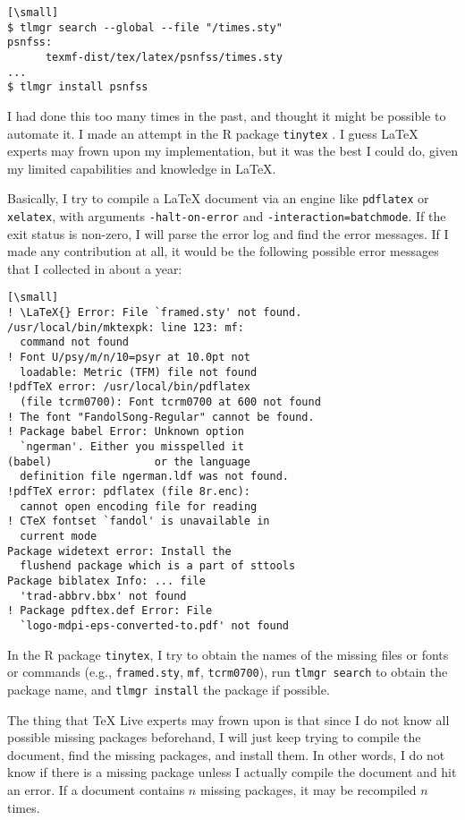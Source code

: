 \documentclass{ltugboat}
\def\tinytex{\texttt{tinytex}}
\begin{document}
\begin{verbatim}[\small]
$ tlmgr search --global --file "/times.sty"
psnfss:
      texmf-dist/tex/latex/psnfss/times.sty
...
$ tlmgr install psnfss
\end{verbatim}

I had done this too many times in the past, and thought it might be
possible to automate it. I made an attempt in the R package
\tinytex{} \cite{R-tinytex}. I guess \LaTeX{} experts may frown upon
my implementation, but it was the best I could do, given my limited
capabilities and knowledge in \LaTeX{}.

Basically, I try to compile a \LaTeX{} document via an engine like
\texttt{pdflatex} or \texttt{xelatex}, with arguments
\texttt{-halt-on-error} and \texttt{-interaction=batchmode}. If the exit
status is non-zero, I will parse the error log and find the error
messages. If I made any contribution at all, it would be the following
possible error messages that I collected in about a year:

\begin{verbatim}[\small]
! \LaTeX{} Error: File `framed.sty' not found.
/usr/local/bin/mktexpk: line 123: mf:
  command not found
! Font U/psy/m/n/10=psyr at 10.0pt not
  loadable: Metric (TFM) file not found
!pdfTeX error: /usr/local/bin/pdflatex
  (file tcrm0700): Font tcrm0700 at 600 not found
! The font "FandolSong-Regular" cannot be found.
! Package babel Error: Unknown option
  `ngerman'. Either you misspelled it
(babel)                or the language
  definition file ngerman.ldf was not found.
!pdfTeX error: pdflatex (file 8r.enc):
  cannot open encoding file for reading
! CTeX fontset `fandol' is unavailable in
  current mode
Package widetext error: Install the
  flushend package which is a part of sttools
Package biblatex Info: ... file
  'trad-abbrv.bbx' not found
! Package pdftex.def Error: File
  `logo-mdpi-eps-converted-to.pdf' not found
\end{verbatim}

In the R package \tinytex{}, I try to obtain the names of the
missing files or fonts or commands (e.g., \texttt{framed.sty},
\texttt{mf}, \texttt{tcrm0700}), run \texttt{tlmgr\ search} to obtain
the package name, and \texttt{tlmgr\ install} the package if possible.

The thing that \TeX{} Live experts may frown upon is that since I do not
know all possible missing packages beforehand, I will just keep trying
to compile the document, find the missing packages, and install them. In
other words, I do not know if there is a missing package unless I
actually compile the document and hit an error. If a document contains
\(n\) missing packages, it may be recompiled \(n\) times.
\end{document}
